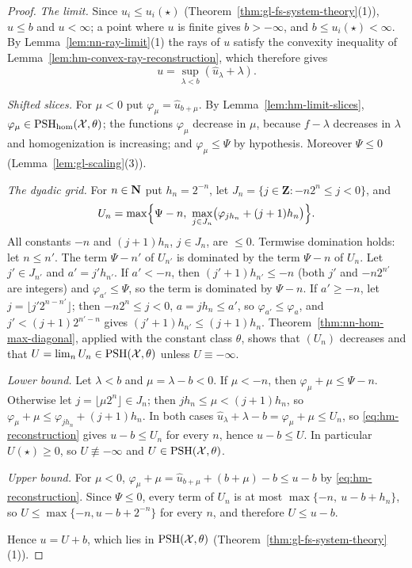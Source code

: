 \begin{proof}
\emph{The limit.} Since $u_i\le u_i(\star)$ (Theorem~\ref{thm:gl-fs-system-theory}(1)), $u\le b$ and $u<\infty$; a point where $u$ is finite gives $b>-\infty$, and
$b\le u_i(\star)<\infty$. By Lemma~\ref{lem:nn-ray-limit}(1) the rays of $u$ satisfy the convexity inequality of Lemma~\ref{lem:hm-convex-ray-reconstruction}, which
therefore gives
\begin{equation}\label{eq:hm-reconstruction}
u=\sup_{\lambda<b}(\hat u_\lambda+\lambda).
\end{equation}

\emph{Shifted slices.} For $\mu<0$ put $\varphi_\mu=\hat u_{b+\mu}$. By Lemma~\ref{lem:hm-limit-slices}, $\varphi_\mu\in\operatorname{PSH}_{\mathrm{hom}}(\mathcal X,\theta)$; the
functions $\varphi_\mu$ decrease in $\mu$, because $f-\lambda$ decreases in $\lambda$ and homogenization is increasing; and $\varphi_\mu\le\Psi$ by hypothesis.
Moreover $\Psi\le0$ (Lemma~\ref{lem:gl-scaling}(3)).

\emph{The dyadic grid.} For $n\in\mathbf{N}$ put $h_n=2^{-n}$, let $J_n=\{j\in\mathbf Z:-n2^n\le j<0\}$, and
\[
U_n=\max\Bigl\{\Psi-n,\ \max_{j\in J_n}\bigl(\varphi_{jh_n}+(j+1)h_n\bigr)\Bigr\}.
\]
All constants $-n$ and $(j+1)h_n$, $j\in J_n$, are $\le0$. Termwise domination holds: let $n\le n'$. The term $\Psi-n'$ of $U_{n'}$ is dominated by the term
$\Psi-n$ of $U_n$. Let $j'\in J_{n'}$ and $a'=j'h_{n'}$. If $a'<-n$, then $(j'+1)h_{n'}\le-n$ (both $j'$ and $-n2^{n'}$ are integers) and
$\varphi_{a'}\le\Psi$, so the term is dominated by $\Psi-n$. If $a'\ge-n$, let $j=\lfloor j'2^{n-n'}\rfloor$; then $-n2^n\le j<0$, $a=jh_n\le a'$, so
$\varphi_{a'}\le\varphi_a$, and $j'<(j+1)2^{n'-n}$ gives $(j'+1)h_{n'}\le(j+1)h_n$. Theorem~\ref{thm:nn-hom-max-diagonal}, applied with the constant class $\theta$,
shows that $(U_n)$ decreases and that $U=\lim_nU_n\in\operatorname{PSH}(\mathcal X,\theta)$ unless $U\equiv-\infty$.

\emph{Lower bound.} Let $\lambda<b$ and $\mu=\lambda-b<0$. If $\mu<-n$, then $\varphi_\mu+\mu\le\Psi-n$. Otherwise let $j=\lfloor\mu2^n\rfloor\in J_n$; then
$jh_n\le\mu<(j+1)h_n$, so $\varphi_\mu+\mu\le\varphi_{jh_n}+(j+1)h_n$. In both cases $\hat u_\lambda+\lambda-b=\varphi_\mu+\mu\le U_n$, so
\eqref{eq:hm-reconstruction} gives $u-b\le U_n$ for every $n$, hence $u-b\le U$. In particular $U(\star)\ge0$, so $U\not\equiv-\infty$ and $U\in\operatorname{PSH}(\mathcal X,\theta)$.

\emph{Upper bound.} For $\mu<0$, $\varphi_\mu+\mu=\hat u_{b+\mu}+(b+\mu)-b\le u-b$ by \eqref{eq:hm-reconstruction}. Since $\Psi\le0$, every term of $U_n$ is at most
$\max\{-n,\ u-b+h_n\}$, so $U\le\max\{-n,u-b+2^{-n}\}$ for every $n$, and therefore $U\le u-b$.

Hence $u=U+b$, which lies in $\operatorname{PSH}(\mathcal X,\theta)$ (Theorem~\ref{thm:gl-fs-system-theory}(1)).
\end{proof}


